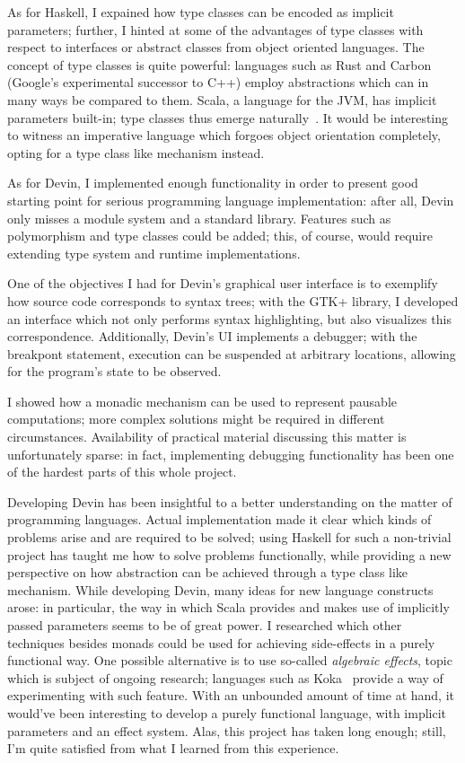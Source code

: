 \documentclass[UdineBachThesis,american,11pt]{PhdThesis}
\begin{document}
  As for Haskell, I expained how type classes can be encoded as implicit
  parameters; further, I hinted at some of the advantages of type classes with
  respect to interfaces or abstract classes from object oriented languages. The
  concept of type classes is quite powerful: languages such as Rust and Carbon
  (Google's experimental successor to C++) employ abstractions which can in many
  ways be compared to them. Scala, a language for the JVM, has implicit
  parameters built-in; type classes thus emerge
  naturally~\cite{scala-type-classes}. It would be interesting to witness an
  imperative language which forgoes object orientation completely, opting for a
  type class like mechanism instead.

  As for Devin, I implemented enough functionality in order to present good
  starting point for serious programming language implementation: after all,
  Devin only misses a module system and a standard library. Features such as
  polymorphism and type classes could be added; this, of course, would require
  extending type system and runtime implementations.

  One of the objectives I had for Devin's graphical user interface is to
  exemplify how source code corresponds to syntax trees; with the GTK+ library,
  I developed an interface which not only performs syntax highlighting, but also
  visualizes this correspondence. Additionally, Devin's UI implements a
  debugger; with the breakpont statement, execution can be suspended
  at arbitrary locations, allowing for the program's state to be observed.

  I showed how a monadic mechanism can be used to represent pausable
  computations; more complex solutions might be required in different
  circumstances. Availability of practical material discussing this matter is
  unfortunately sparse: in fact, implementing debugging functionality has been
  one of the hardest parts of this whole project.

  \pagebreak

  Developing Devin has been insightful to a better understanding on the matter
  of programming languages. Actual implementation made it clear which kinds of
  problems arise and are required to be solved; using Haskell for such a
  non-trivial project has taught me how to solve problems functionally, while
  providing a new perspective on how abstraction can be achieved through a type
  class like mechanism. While developing Devin, many ideas for new language
  constructs arose: in particular, the way in which Scala provides and makes use
  of implicitly passed parameters seems to be of great power. I researched which
  other techniques besides monads could be used for achieving side-effects in a
  purely functional way. One possible alternative is to use so-called
  \emph{algebraic effects}, topic which is subject of ongoing research;
  languages such as Koka~\cite{koka} provide a way of experimenting with such
  feature. With an unbounded amount of time at hand, it would've been
  interesting to develop a purely functional language, with implicit parameters
  and an effect system. Alas, this project has taken long enough; still, I'm
  quite satisfied from what I learned from this experience.
\end{document}
